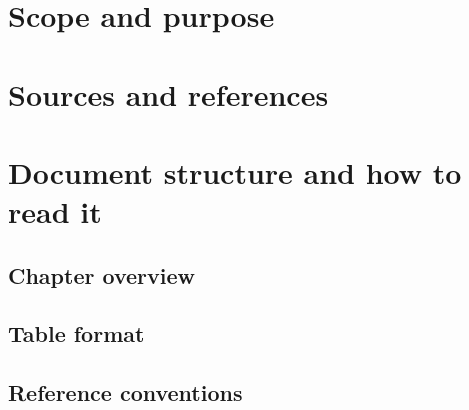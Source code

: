 \documentclass[11pt, a4paper, twoside]{report}
\begin{document}
\section{Scope and purpose}
\label{sec:C1-S1}

\section{Sources and references}
\label{sec:C1-S2}

\section{Document structure and how to read it}
\label{sec:C1-S3}

\subsection{Chapter overview}
\label{sec:C1-S3-S1}

\subsection{Table format}
\label{sec:C1-S3-S2}

\subsection{Reference conventions}
\label{sec:C1-S3-S3}

\end{document}
